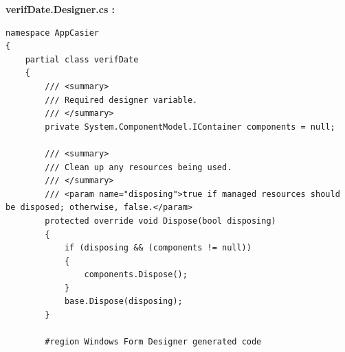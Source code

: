 \documentclass[main.tex]{subfiles}
\begin{document}
\textbf{verifDate.Designer.cs :}

\begin{lstlisting}
namespace AppCasier
{
    partial class verifDate
    {
        /// <summary>
        /// Required designer variable.
        /// </summary>
        private System.ComponentModel.IContainer components = null;

        /// <summary>
        /// Clean up any resources being used.
        /// </summary>
        /// <param name="disposing">true if managed resources should be disposed; otherwise, false.</param>
        protected override void Dispose(bool disposing)
        {
            if (disposing && (components != null))
            {
                components.Dispose();
            }
            base.Dispose(disposing);
        }

        #region Windows Form Designer generated code


\end{lstlisting}
\end{document}
